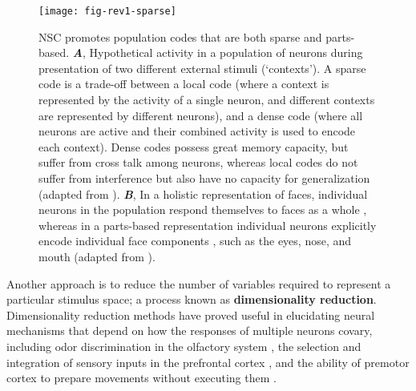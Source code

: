 \begin{figure}[h]
	\centering
	\texttt{[image: fig-rev1-sparse]}
    \caption{\Acf{NSC} promotes population codes that are both sparse and parts-based.
    \textbf{\emph{A}},
    	   Hypothetical activity in a population of neurons
           during presentation of two different external stimuli (`contexts').
           A sparse code is a trade-off between a local code
           (where a context is represented by the activity of a single neuron,
           and different contexts are represented by different neurons), and a
           dense code (where all neurons are active and their combined activity is
           used to encode each context).
           Dense codes possess great memory capacity, but suffer from cross talk
           among neurons, whereas local codes do not suffer from interference
           but also have no capacity for generalization
           (adapted from \cite{SpanneJorntell2015}).
     \textbf{\emph{B}},
           In a holistic representation of faces, 
           individual neurons in the population
           respond themselves to faces as a whole \cite{TanakaFarah1993},
           whereas in a parts-based representation
           individual neurons explicitly encode individual face components
           \cite{Palmer1977},
           such as the eyes, nose, and mouth
           (adapted from \cite{LeeSeung1999}).}
	\label{fig:sparse-parts}
\end{figure}


Another approach is to reduce the number of
variables required to represent a particular stimulus space;
a process known as
\textbf{dimensionality reduction}.
Dimensionality reduction methods have proved useful in elucidating neural mechanisms
that depend on how the responses of multiple neurons covary,
including odor discrimination in the olfactory system \cite{Broome2006,Koulakov2011},
the selection and integration of sensory inputs 
in the prefrontal cortex \cite{Mante2013},
and the ability of premotor cortex 
to prepare movements without executing them \cite{Kaufman2014}.

